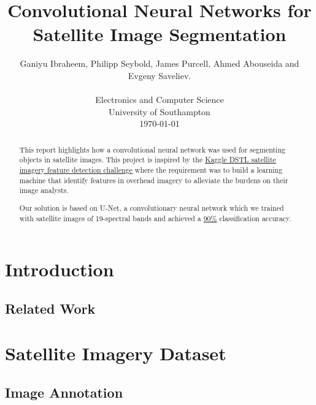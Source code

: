 \documentclass[10pt,twocolumn]{article}
\begin{document}
\title{Convolutional Neural Networks for Satellite Image Segmentation}

\author{Ganiyu Ibraheem, Philipp Seybold, James Purcell, Ahmed Abouseida and Evgeny Saveliev. \\
\\
Electronics and Computer Science \\
University of Southampton \\
\today
}


\maketitle
\thispagestyle{empty}

\begin{abstract}
This report highlights how a convolutional neural network was used for segmenting objects in satellite images. This project is inspired by the \href{https://www.kaggle.com/c/dstl-satellite-imagery-feature-detection}{Kaggle DSTL satellite imagery feature detection challenge} where the requirement was to build a learning machine that identify features in overhead imagery to alleviate the burdens on their image analysts.

Our solution is based on U-Net, a convolutionary neural network which we trained with satellite images of 19-spectral bands and achieved a \underline{90\%} classification accuracy. %
\end{abstract}


\section{Introduction}

	\subsection{Related Work}


\section{Satellite Imagery Dataset}
	\subsection{Image Annotation}
\end{document}
